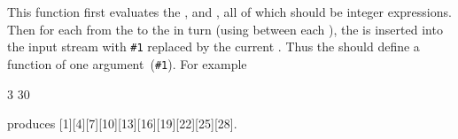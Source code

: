 \documentclass[oneside]{book}
\begin{document}

\begin{function}{\IntStepInline}
\begin{syntax}
    
\end{syntax}
This function first evaluates the , 
and , all of which should be integer expressions.
Then for each  from the  to the
 in turn (using  between each
), the  is inserted into the input stream
with \verb|#1| replaced by the current . Thus the
 should define a function of one argument~(\verb|#1|).
For example
\begin{codehigh}
\IgnoreSpacesOn
\TlClear \lTmpaTl
{} {3} {30} {
  \TlPutRight \lTmpaTl {[#1]}
}
\Result {\Value\lTmpaTl}
\IgnoreSpacesOff
\end{codehigh}
produces [1][4][7][10][13][16][19][22][25][28].
\end{function}
\end{document}
